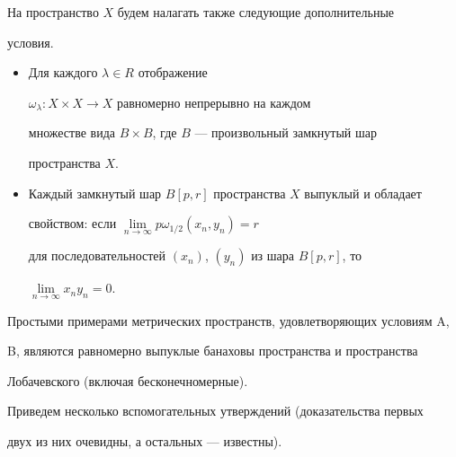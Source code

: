 На пространство $X$ будем налагать также следующие дополнительные


условия. 


\begin{itemize}


\item[A)] Для каждого $\lambda \in R$ отображение


$\omega_{\lambda} : X\times X \to X$ равномерно непрерывно на каждом


множестве вида $B\times B$, где $B$ --- произвольный замкнутый шар


пространства $X$.


\item[B)] Каждый замкнутый шар $B[p,r]$ пространства $X$ выпуклый и обладает


свойством: если $\lim\limits_{n \to \infty}{p\omega_{1/2}(x_{n},y_{n})} = r$


для последовательностей $(x_{n})$, $(y_{n})$ из шара $B[p,r]$, то


$\lim\limits_{n \to \infty}{x_{n}y_{n}} = 0$.


\end{itemize}





Простыми примерами метрических пространств, удовлетворяющих условиям A,


B, являются равномерно выпуклые банаховы пространства и пространства


Лобачевского (включая бесконечномерные).





Приведем несколько вспомогательных утверждений (доказательства первых


двух из них очевидны, а остальных --- известны).


